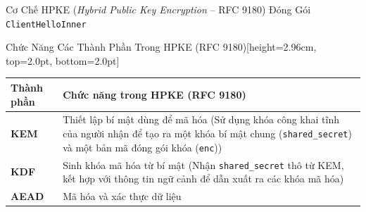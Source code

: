 \documentclass[aspectratio=169, 10pt]{beamer}
\begin{document}
\begin{frame}{Cơ Chế HPKE (\textit{Hybrid Public Key Encryption} -- RFC 9180) Đóng Gói \texttt{ClientHelloInner}}
	\begin{accentcard}[uetblue]{Chức Năng Các Thành Phần Trong HPKE (RFC 9180)}[height=2.96cm, top=2.0pt, bottom=2.0pt]
		\centering
		\fontsize{5.95pt}{7.5pt}\selectfont
		\renewcommand{\arraystretch}{1.20}
		\setlength{\tabcolsep}{5pt}
		\begin{tabularx}{\linewidth}{l >{\raggedright\arraybackslash}X}
			\toprule
			\rowcolor{uetaccentbg}
			\textbf{\color{uetblue}Thành phần} & \textbf{\color{uetblue}Chức năng trong HPKE (RFC 9180)} \\
			\midrule
			\textbf{KEM} & Thiết lập bí mật dùng để mã hóa (Sử dụng khóa công khai tĩnh của người nhận để tạo ra một khóa bí mật chung (\texttt{shared\_secret}) và một bản mã đóng gói khóa (\texttt{enc})) \\
			\rowcolor{uetlightgray}
			\textbf{KDF} & Sinh khóa mã hóa từ bí mật (Nhận \texttt{shared\_secret} thô từ KEM, kết hợp với thông tin ngữ cảnh để dẫn xuất ra các khóa mã hóa) \\
			\textbf{AEAD} & Mã hóa và xác thực dữ liệu \\
			\bottomrule
		\end{tabularx}
	\end{accentcard}
\end{frame}
\end{document}
